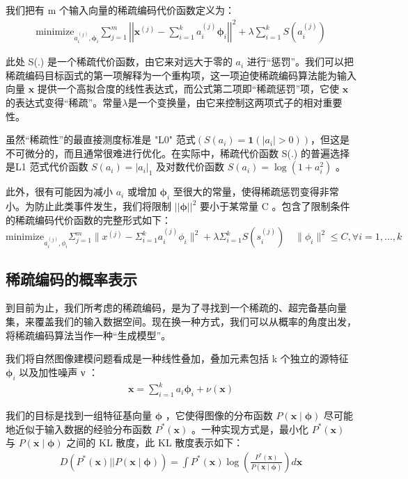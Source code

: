 我们把有 m 个输入向量的稀疏编码代价函数定义为：
\begin{align}
\text{minimize}_{a^{(j)}_i,\mathbf{\phi}_{i}} \sum_{j=1}^{m} \left|\left| \mathbf{x}^{(j)} - \sum_{i=1}^k a^{(j)}_i \mathbf{\phi}_{i}\right|\right|^{2} + \lambda \sum_{i=1}^{k}S(a^{(j)}_i)
\end{align}

此处 S(.) 是一个稀疏代价函数，由它来对远大于零的 $a_i$ 进行“惩罚”。我们可以把稀疏编码目标函式的第一项解释为一个重构项，这一项迫使稀疏编码算法能为输入向量 $\mathbf{x}$ 提供一个高拟合度的线性表达式，而公式第二项即“稀疏惩罚”项，它使 $\mathbf{x}$ 的表达式变得“稀疏”。常量$\lambda$是一个变换量，由它来控制这两项式子的相对重要性。

虽然“稀疏性”的最直接测度标准是 "L0" 范式$(S(a_i) = \mathbf{1}(|a_i|>0))$，但这是不可微分的，而且通常很难进行优化。在实际中，稀疏代价函数 S(.) 的普遍选择是L1 范式代价函数 $S(a_i)=\left|a_i\right|_1$  及对数代价函数 $S(a_i)=\log(1+a_i^2)$ 。

此外，很有可能因为减小 $a_i$ 或增加 $\mathbf{\phi}_i$ 至很大的常量，使得稀疏惩罚变得非常小。为防止此类事件发生，我们将限制 $\left|\left|\mathbf{\phi}\right|\right|^2$ 要小于某常量 C 。包含了限制条件的稀疏编码代价函数的完整形式如下：
\begin{equation}
\text{minimize}_{a_i^{(j)},\phi_i}\Sigma_{j=1}^m\|x^{(j)}-\Sigma_{i=1}^ka_i^{(j)}\phi_i\|^2+\lambda\Sigma_{i=1}^kS(s_i^{(j)})\quad\|\phi_i\|^2\leq C,\forall i=1,\ldots,k
\end{equation}
\subsection{稀疏编码的概率表示}
到目前为止，我们所考虑的稀疏编码，是为了寻找到一个稀疏的、超完备基向量集，来覆盖我们的输入数据空间。现在换一种方式，我们可以从概率的角度出发，将稀疏编码算法当作一种“生成模型”。

我们将自然图像建模问题看成是一种线性叠加，叠加元素包括 k 个独立的源特征 $\mathbf{\phi}_i$ 以及加性噪声 ν ：
\begin{align}
\mathbf{x} = \sum_{i=1}^k a_i \mathbf{\phi}_{i} + \nu(\mathbf{x})
\end{align}

我们的目标是找到一组特征基向量 $\mathbf{\phi}$ ，它使得图像的分布函数 $P(\mathbf{x}\mid\mathbf{\phi})$ 尽可能地近似于输入数据的经验分布函数 $P^*(\mathbf{x})$ 。一种实现方式是，最小化 $P^*(\mathbf{x})$ 与 $P(\mathbf{x}\mid\mathbf{\phi})$ 之间的 KL 散度，此 KL 散度表示如下：
\begin{align}
D(P^*(\mathbf{x})||P(\mathbf{x}\mid\mathbf{\phi})) = \int P^*(\mathbf{x}) \log \left(\frac{P^*(\mathbf{x})}{P(\mathbf{x}\mid\mathbf{\phi})}\right)d\mathbf{x}
\end{align}

